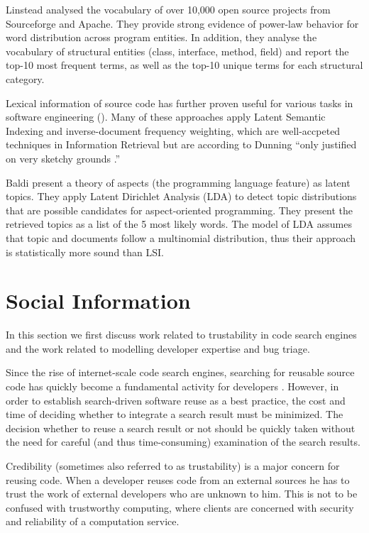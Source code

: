 Linstead \etal \cite{Linstead09SUITE} analysed the vocabulary of over 10,000 open source projects from Sourceforge and Apache. They provide strong evidence of power-law behavior for word distribution across program entities. In addition, they analyse the vocabulary of structural entities (class, interface, method, field) and report the top-10 most frequent terms, as well as the top-10 unique terms for each structural category.

Lexical information of source code has further proven useful for various tasks in software engineering (\eg \cite{Anto02a,Marc05a,Posh09a}). Many of these approaches apply Latent Semantic Indexing and inverse-document frequency weighting, which are well-accpeted techniques in Information Retrieval but are according to Dunning ``only justified on very sketchy grounds \cite{Dunning}.''

Baldi \etal \cite{Bald08a} present a theory of aspects (the programming language feature) as latent topics. They apply Latent Dirichlet Analysis (LDA) to detect topic distributions that are possible candidates for aspect-oriented programming. They present the retrieved topics as a list of the 5 most likely words. The model of LDA assumes that topic and documents follow a multinomial distribution, thus their approach is statistically more sound than LSI.


\section{Social Information}

In this section we first discuss work related to trustability in code search engines and the work related to modelling developer expertise and bug triage.

Since the rise of internet-scale code search engines, searching for reusable source code has quickly become a fundamental activity for developers \cite{Kuhn09b}. However, in order to establish search-driven software reuse as a best practice, the cost and time of deciding whether to integrate a search result must be minimized. The decision whether to reuse a search result or not should be quickly taken without the need for careful (and thus time-consuming) examination of the search results.

Credibility (sometimes also referred to as trustability) is a major concern for reusing code. When a developer reuses code from an external sources he has to trust the work of external developers who are unknown to him. This is not to be confused with trustworthy computing, where clients are concerned with security and reliability of a computation service.

